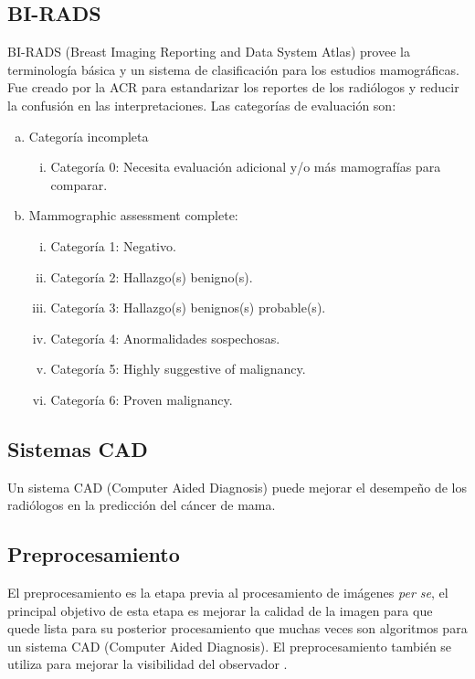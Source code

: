 \subsection{BI-RADS}

BI-RADS (Breast Imaging Reporting and Data System Atlas)
\cite{reston2003birads} provee la terminología básica y un sistema de
clasificación para los estudios mamográficas. Fue creado por la ACR para
estandarizar los reportes de los radiólogos y reducir la confusión en las
interpretaciones. Las categorías de evaluación son:

\begin{enumerate}[a)]
    \item Categoría incompleta
    \begin{enumerate}[i.]
        \item Categoría 0: Necesita evaluación adicional y/o más mamografías para comparar.
    \end{enumerate}
    \item Mammographic assessment complete:
    \begin{enumerate}[i.]
        \item Categoría 1: Negativo.
        \item Categoría 2: Hallazgo(s) benigno(s).
        \item Categoría 3: Hallazgo(s) benignos(s) probable(s).
        \item Categoría 4: Anormalidades sospechosas.
        \item Categoría 5: Highly suggestive of malignancy.         
        \item Categoría 6: Proven malignancy.
    \end{enumerate}
\end{enumerate}

\subsection{Sistemas CAD}

Un sistema CAD (Computer Aided Diagnosis) puede mejorar el desempeño de los
radiólogos en la predicción del cáncer de mama.

\subsection{Preprocesamiento}
El preprocesamiento es la etapa previa al procesamiento de imágenes \textit{per
se}, el principal objetivo de esta etapa es mejorar la calidad de la imagen
para que quede lista para su posterior procesamiento \cite{ponraj2011survey}
que muchas veces son algoritmos para un sistema CAD (Computer Aided Diagnosis).
El preprocesamiento también se utiliza para mejorar la visibilidad del
observador \cite{rahmati2010new}. 

